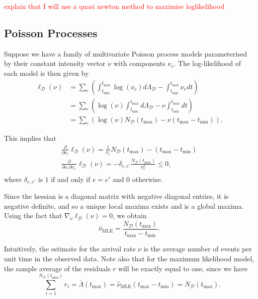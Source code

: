 \documentclass[honours,12pt]{unswthesis}
\numberwithin{equation}{section}
\begin{document}
\textcolor{red}{explain that I will use a quasi newton method to maximise loglikelihood}

\subsection{Poisson Processes}
Suppose we have a family of multivariate Poisson process models parameterised by their constant intensity vector $\nu$ with components $\nu_e$. The log-likelihood of each model is then given by
\begin{equation}
	\begin{align}
		\ell_\mathcal{D}(\nu) &= \sum_e \left(\int_{t_\mathrm{min}}^{t_\mathrm{max}}\log(\nu_e)d\Lambda_\mathcal{D}-\int_{t_\mathrm{min}}^{t_\mathrm{max}}\nu_e dt\right)\\
		&= \sum_e \left( \log(\nu)\int_{t_\mathrm{min}}^{t_\mathrm{max}}d\Lambda_\mathcal{D} - \nu\int_{t_\mathrm{min}}^{t_\mathrm{max}}dt \right)\\
		&= \sum_e \left(\log(\nu)N_\mathcal{D}\left(t_\mathrm{max}\right) - \nu\left(t_\mathrm{max}-t_\mathrm{min}\right)\right).
	\end{align}
\end{equation}

This implies that
\begin{equation}
	\begin{align}
		\frac{\partial}{\partial\nu_e}\ell_\mathcal{D}(\nu) = \frac{1}{\nu_e}N_\mathcal{D}\left(t_\mathrm{max}\right)-\left(t_\mathrm{max}-t_\mathrm{min}\right) \\
		\frac{\partial}{\partial\nu_e\partial\nu_{e'}}\ell_\mathcal{D}(\nu) = -\delta_{e,e'}\frac{N_\mathcal{D}\left(t_\mathrm{max}\right)}{\nu_e^2} \leq 0, \\
	\end{align}
\end{equation}
where $\delta_{e,e'}$ is $1$ if and only if $e=e'$ and $0$ otherwise.

Since the hessian is a diagonal matrix with negative diagonal entries, it is negative definite, and so a unique local maxima exists and is a global maxima. Using the fact that $\nabla_\nu \ell_\mathcal{D}(\nu)=0$, we obtain
\begin{equation}
	\hat\nu_\mathrm{MLE} = \frac{N_\mathcal{D}(t_\mathrm{max})}{t_\mathrm{max}-t_\mathrm{min}}.
\end{equation}

Intuitively, the estimate for the arrival rate $\nu$ is the average number of events per unit time in the observed data. Note also that for the maximum likelihood model, the sample average of the residuals $r$ will be exactly equal to one, since we have
$$\sum_{i=1}^{N_\mathcal{D}(t_\mathrm{max})} r_i = \bar\Lambda(t_\mathrm{max})=\hat\nu_\mathrm{MLE}(t_\mathrm{max}-t_\mathrm{min}) =N_\mathcal{D}(t_\mathrm{max}).$$
\end{document}
